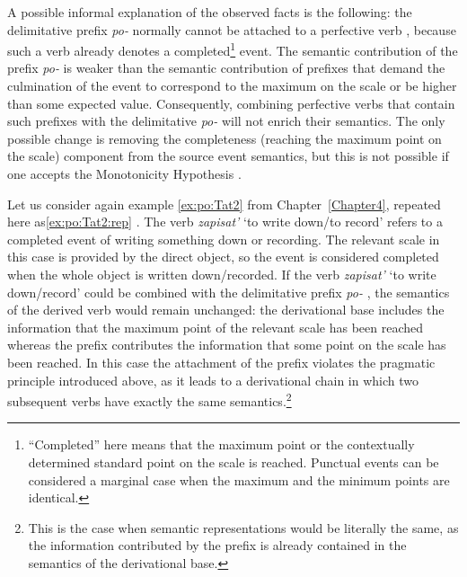 A possible informal explanation of the observed facts is the following: the delimitative  prefix \textit{po-}   normally cannot be attached to a perfective verb , because such a verb already denotes a completed\footnote{``Completed'' here means that the maximum point or the contextually determined standard point on the scale is reached. Punctual events can be considered a marginal case when the maximum and the minimum points are identical.} event. The semantic contribution of the prefix \textit{po-}   is weaker than the semantic contribution of prefixes that demand the culmination of the event to correspond to the maximum on the scale or be higher than some expected value. Consequently, combining perfective verbs  that contain such prefixes with the delimitative  \textit{po-}   will not enrich their semantics. The only possible change is removing the completeness (reaching the maximum point on the scale) component from the source event semantics, but this is not possible if one accepts the Monotonicity Hypothesis \citep{Kiparsky:82}.

Let us consider again example \ref{ex:po:Tat2} from Chapter~\ref{Chapter4}, repeated here as\ref{ex:po:Tat2:rep} \citet{Tatevosov:09}. The verb \textit{zapisat'} `to write down/to record' refers to a completed event of writing something down or recording. The relevant scale in this case is provided by the direct object, so the event is considered completed when the whole object is written down/recorded. If the verb \textit{zapisat'} `to write down/record' could be combined with the delimitative  prefix \textit{po-}  , the semantics of the derived verb would remain unchanged: the derivational base includes the information that the maximum point of the relevant scale has been reached whereas the prefix contributes the information that some point on the scale has been reached. In this case the attachment of the prefix violates the pragmatic principle introduced above, as it leads to a derivational chain in which two subsequent verbs have exactly the same semantics.\footnote{This is the case when semantic representations would be literally the same, as the information contributed by the prefix is already contained in the semantics of the derivational base.}

